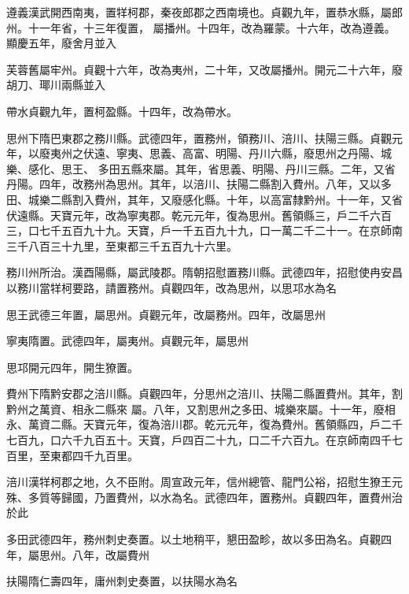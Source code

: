 \begin{pinyinscope}
 遵義漢武開西南夷，置䍧柯郡，秦夜郎郡之西南境也。貞觀九年，置恭水縣，屬郎州。十一年省，十三年復置，
 屬播州。十四年，改為羅蒙。十六年，改為遵義。顯慶五年，廢舍月並入



 芙蓉舊屬牢州。貞觀十六年，改為夷州，二十年，又改屬播州。開元二十六年，廢胡刀、瑘川兩縣並入



 帶水貞觀九年，置柯盈縣。十四年，改為帶水。



 思州下隋巴東郡之務川縣。武德四年，置務州，領務川、涪川、扶陽三縣。貞觀元年，以廢夷州之伏遠、寧夷、思義、高富、明陽、丹川六縣，廢思州之丹陽、城樂、感化、思王、
 多田五縣來屬。其年，省思義、明陽、丹川三縣。二年，又省丹陽。四年，改務州為思州。其年，以涪川、扶陽二縣割入費州。八年，又以多田、城樂二縣割入費州，其年，又廢感化縣。十年，以高富隸黔州。十一年，又省伏遠縣。天寶元年，改為寧夷郡。乾元元年，復為思州。舊領縣三，戶二千六百三，口七千五百九十九。天寶，戶一千五百九十九，口一萬二千二十一。在京師南三千八百三十九里，至東都三千五百九十六里。



 務川州所治。漢酉陽縣，屬武陵郡。隋朝招慰置務川縣。武德四年，招慰使冉安昌以務川當䍧柯要路，請置務州。貞觀四年，改為思州，以思邛水為名



 思王武德三年置，屬思州。貞觀元年，改屬務州。四年，改屬思州



 寧夷隋置。武德四年，屬夷州。貞觀元年，屬思州



 思邛開元四年，開生獠置。



 費州下隋黔安郡之涪川縣。貞觀四年，分思州之涪川、扶陽二縣置費州。其年，割黔州之萬資、相永二縣來
 屬。八年，又割思州之多田、城樂來屬。十一年，廢相永、萬資二縣。天寶元年，復為涪川郡。乾元元年，復為費州。舊領縣四，戶二千七百九，口六千九百五十。天寶，戶四百二十九，口二千六百九。在京師南四千七百里，至東都四千九百里。



 涪川漢䍧柯郡之地，久不臣附。周宣政元年，信州總管、龍門公裕，招慰生獠王元殊、多質等歸國，乃置費州，以水為名。武德四年，置務州。貞觀四年，置費州治於此



 多田武德四年，務州刺史奏置。以土地稍平，懇田盈畛，故以多田為名。貞觀四年，屬思州。八年，改屬費州



 扶陽隋仁壽四年，庸州刺史奏置，以扶陽水為名




\end{pinyinscope}

